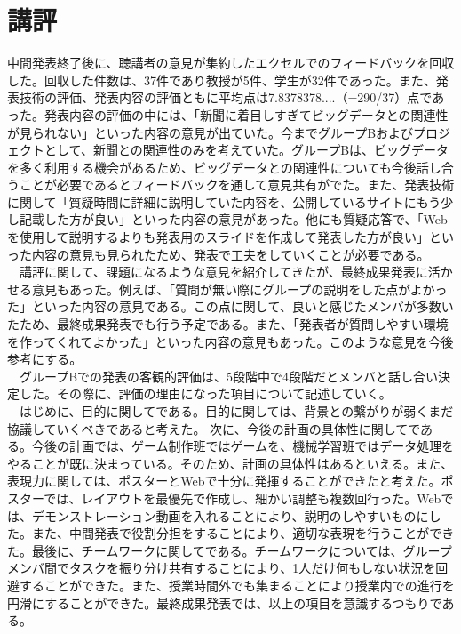 \section{講評}
中間発表終了後に、聴講者の意見が集約したエクセルでのフィードバックを回収した。回収した件数は、37件であり教授が5件、学生が32件であった。また、発表技術の評価、発表内容の評価ともに平均点は7.8378378....（=290/37）点であった。発表内容の評価の中には、「新聞に着目しすぎてビッグデータとの関連性が見られない」といった内容の意見が出ていた。今までグループBおよびプロジェクトとして、新聞との関連性のみを考えていた。グループBは、ビッグデータを多く利用する機会があるため、ビッグデータとの関連性についても今後話し合うことが必要であるとフィードバックを通して意見共有がでた。また、発表技術に関して「質疑時間に詳細に説明していた内容を、公開しているサイトにもう少し記載した方が良い」といった内容の意見があった。他にも質疑応答で、「Webを使用して説明するよりも発表用のスライドを作成して発表した方が良い」といった内容の意見も見られたため、発表で工夫をしていくことが必要である。\\
　講評に関して、課題になるような意見を紹介してきたが、最終成果発表に活かせる意見もあった。例えば、「質問が無い際にグループの説明をした点がよかった」といった内容の意見である。この点に関して、良いと感じたメンバが多数いたため、最終成果発表でも行う予定である。また、「発表者が質問しやすい環境を作ってくれてよかった」といった内容の意見もあった。このような意見を今後参考にする。\\
　グループBでの発表の客観的評価は、5段階中で4段階だとメンバと話し合い決定した。その際に、評価の理由になった項目について記述していく。\\
　はじめに、目的に関してである。目的に関しては、背景との繋がりが弱くまだ協議していくべきであると考えた。 次に、今後の計画の具体性に関してである。今後の計画では、ゲーム制作班ではゲームを、機械学習班ではデータ処理をやることが既に決まっている。そのため、計画の具体性はあるといえる。また、表現力に関しては、ポスターとWebで十分に発揮することができたと考えた。ポスターでは、レイアウトを最優先で作成し、細かい調整も複数回行った。Webでは、デモンストレーション動画を入れることにより、説明のしやすいものにした。また、中間発表で役割分担をすることにより、適切な表現を行うことができた。最後に、チームワークに関してである。チームワークについては、グループメンバ間でタスクを振り分け共有することにより、1人だけ何もしない状況を回避することができた。また、授業時間外でも集まることにより授業内での進行を円滑にすることができた。最終成果発表では、以上の項目を意識するつもりである。
